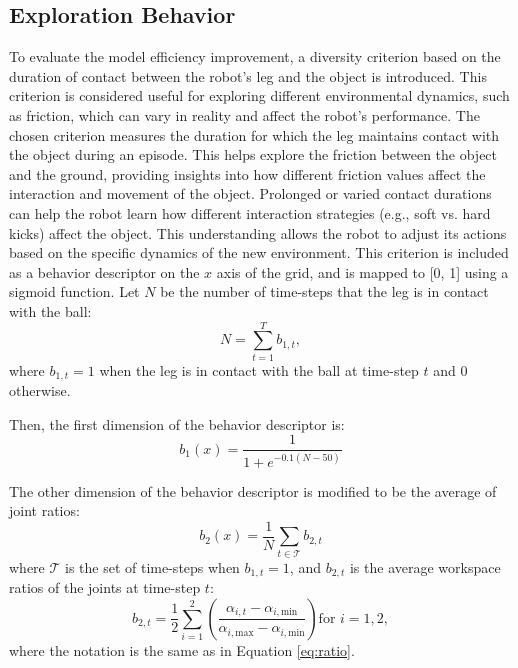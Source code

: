 \documentclass[12pt]{article}
\begin{document}
\subsection{Exploration Behavior}
To evaluate the model efficiency improvement, a diversity criterion based on the duration of contact between the robot's leg and the object is introduced. This criterion is considered useful for exploring different environmental dynamics, such as friction, which can vary in reality and affect the robot's performance. The chosen criterion measures the duration for which the leg maintains contact with the object during an episode. This helps explore the friction between the object and the ground, providing insights into how different friction values affect the interaction and movement of the object. Prolonged or varied contact durations can help the robot learn how different interaction strategies (e.g., soft vs. hard kicks) affect the object. This understanding allows the robot to adjust its actions based on the specific dynamics of the new environment. This criterion is included as a behavior descriptor on the $x$ axis of the grid, and is mapped to [0, 1] using a sigmoid function. Let \( N \) be the number of time-steps that the leg is in contact with the ball:
\begin{equation}
\label{eq:contact}
N = \sum\limits_{t=1}^{T} b_{1,t},
\end{equation}
where \( b_{1,t} = 1 \) when the leg is in contact with the ball at time-step \( t \) and 0 otherwise.

Then, the first dimension of the behavior descriptor is:
\begin{equation}
\label{eq:sigmoid}
b_1(x) = \frac{1}{1 + e^{-0.1\left(N - 50\right)}}
\end{equation}

The other dimension of the behavior descriptor is modified to be the average of joint ratios:
\begin{equation}
\label{eq:desc1}
b_2(x) = \frac{1}{N} \sum\limits_{t \in \mathcal{T}} b_{2,t}
\end{equation}
where \( \mathcal{T} \) is the set of time-steps when \( b_{1,t} = 1 \), and \( b_{2,t} \) is the average workspace ratios of the joints at time-step \( t \):
\begin{equation}
\label{eq:desc2}
b_{2,t} = \frac{1}{2} \sum\limits_{i=1}^{2} \left( \frac{\alpha_{i,t} - \alpha_{i,\text{min}}}{\alpha_{i,\text{max}} - \alpha_{i,\text{min}}} \right) \text{for } i=1,2,
\end{equation}
where the notation is the same as in Equation \ref{eq:ratio}.
\end{document}
